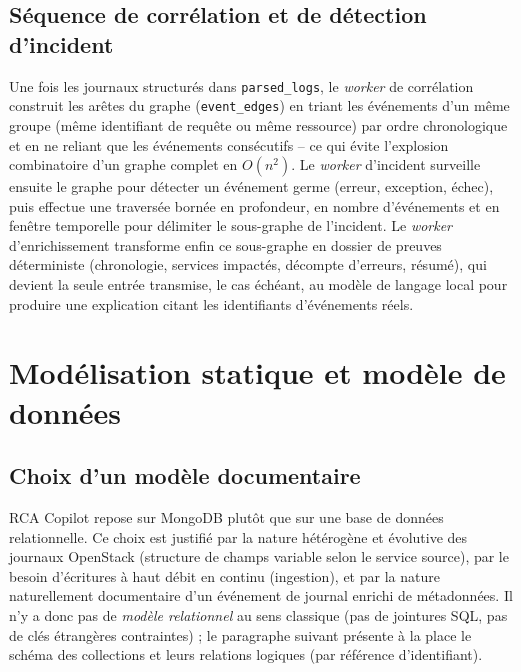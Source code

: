 \documentclass[a4paper,11pt,oneside]{report}
\begin{document}
\subsection{Séquence de corrélation et de détection d'incident}
Une fois les journaux structurés dans \texttt{parsed\_logs}, le \emph{worker} de corrélation construit les arêtes du graphe (\texttt{event\_edges}) en triant les événements d'un même groupe (même identifiant de requête ou même ressource) par ordre chronologique et en ne reliant que les événements consécutifs -- ce qui évite l'explosion combinatoire d'un graphe complet en $O(n^2)$. Le \emph{worker} d'incident surveille ensuite le graphe pour détecter un événement germe (erreur, exception, échec), puis effectue une traversée bornée en profondeur, en nombre d'événements et en fenêtre temporelle pour délimiter le sous-graphe de l'incident. Le \emph{worker} d'enrichissement transforme enfin ce sous-graphe en dossier de preuves déterministe (chronologie, services impactés, décompte d'erreurs, résumé), qui devient la seule entrée transmise, le cas échéant, au modèle de langage local pour produire une explication citant les identifiants d'événements réels.

\section{Modélisation statique et modèle de données}

\subsection{Choix d'un modèle documentaire}
RCA Copilot repose sur MongoDB plutôt que sur une base de données relationnelle. Ce choix est justifié par la nature hétérogène et évolutive des journaux OpenStack (structure de champs variable selon le service source), par le besoin d'écritures à haut débit en continu (ingestion), et par la nature naturellement documentaire d'un événement de journal enrichi de métadonnées. Il n'y a donc pas de \emph{modèle relationnel} au sens classique (pas de jointures SQL, pas de clés étrangères contraintes) ; le paragraphe suivant présente à la place le schéma des collections et leurs relations logiques (par référence d'identifiant).
\end{document}
